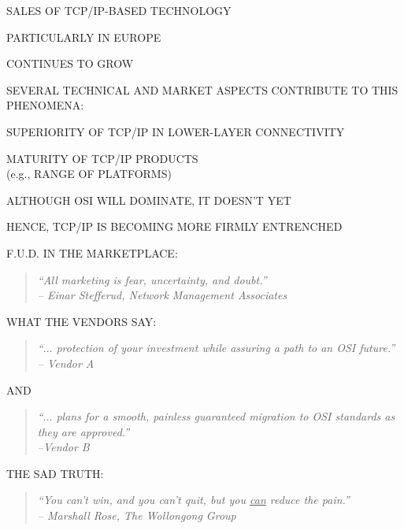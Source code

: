 \begin{bwslide}

\begin{nrtc}
\item	SALES OF TCP/IP-BASED TECHNOLOGY
    \begin{nrtc}
    \item	PARTICULARLY IN EUROPE
    \end{nrtc}
	CONTINUES TO GROW

\item	SEVERAL TECHNICAL AND MARKET ASPECTS CONTRIBUTE TO THIS PHENOMENA:
    \begin{nrtc}
    \item	SUPERIORITY OF TCP/IP IN LOWER-LAYER CONNECTIVITY

    \item	MATURITY OF TCP/IP PRODUCTS\\ (e.g., RANGE OF PLATFORMS)
    \end{nrtc}

\item	ALTHOUGH OSI WILL DOMINATE, IT DOESN'T YET

\item	HENCE, TCP/IP IS BECOMING MORE FIRMLY ENTRENCHED
\end{nrtc}
\end{bwslide}


\begin{bwslide}

\begin{nrtc}
\item	F.U.D. IN THE MARKETPLACE:
\begin{quote}\em
``All marketing is fear, uncertainty, and doubt.''\\ \raggedleft
-- Einar Stefferud, Network Management Associates
\end{quote}

\item	WHAT THE VENDORS SAY:
\begin{quote}\em
``$\ldots$ protection of your investment while assuring a path to an OSI
future.''\\ \raggedleft
-- Vendor A
\end{quote}
AND
\begin{quote}\em
``$\ldots$ plans for a smooth, painless guaranteed migration to OSI standards
as they are approved.''\\ \raggedleft
--Vendor B
\end{quote}

\item	THE SAD TRUTH:
\begin{quote}\em
``You can't win, and you can't quit, but you \underline{can} reduce the
pain.''\\ \raggedleft
-- Marshall Rose, The Wollongong Group
\end{quote}

\end{nrtc}
\end{bwslide}



